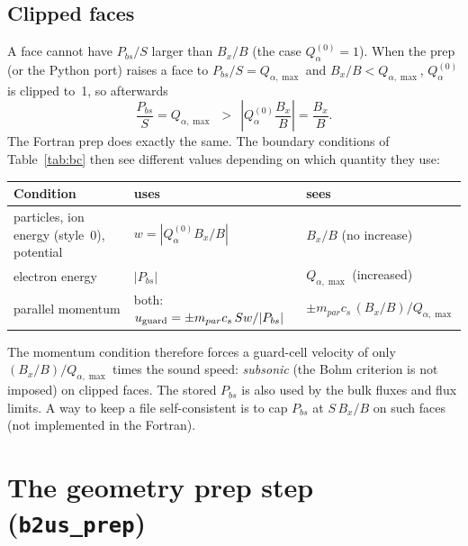 \documentclass[11pt,a4paper]{article}
\newcommand{\qalf}{Q_{\alpha}}
\newcommand{\wrk}{w}
\newcommand{\qmax}{Q_{\alpha,\max}}
\begin{document}
\subsection{Clipped faces}\label{sec:clip}
A face cannot have $P_{bs}/S$ larger than $B_x/B$ (the case $\qalf^{(0)}=1$). When the prep (or the Python port) raises a face to
$P_{bs}/S=\qmax$ and $B_x/B<\qmax$, $\qalf^{(0)}$ is clipped to~1, so afterwards
\[
   \frac{P_{bs}}{S}=\qmax\ \ >\ \ \left|\qalf^{(0)}\frac{B_x}{B}\right| = \frac{B_x}{B}.
\]
The Fortran prep does exactly the same. The boundary conditions of Table~\ref{tab:bc} then see different values
depending on which quantity they use:
\begin{center}\small
\begin{tabular}{lll}
\toprule
Condition & uses & sees \\ \midrule
particles, ion energy (style~0), potential & $\wrk=|\qalf^{(0)}B_x/B|$ & $B_x/B$ (no increase) \\
electron energy & $|P_{bs}|$ & $\qmax$ (increased) \\
parallel momentum & both: $u_{\rm guard}=\pm m_{par}c_s\,S\wrk/|P_{bs}|$ & $\pm m_{par}c_s\,(B_x/B)/\qmax$ \\
\bottomrule
\end{tabular}
\end{center}
The momentum condition therefore forces a guard-cell velocity of only $(B_x/B)/\qmax$ times the sound speed: \emph{subsonic}
(the Bohm criterion is not imposed) on clipped faces. The stored $P_{bs}$ is also used by the bulk fluxes and flux limits.
A way to keep a file self-consistent is to cap $P_{bs}$ at $S\,B_x/B$ on such faces (not implemented in the Fortran).

\section{The geometry prep step (\texttt{b2us\_prep})}\label{sec:prep}
\end{document}
